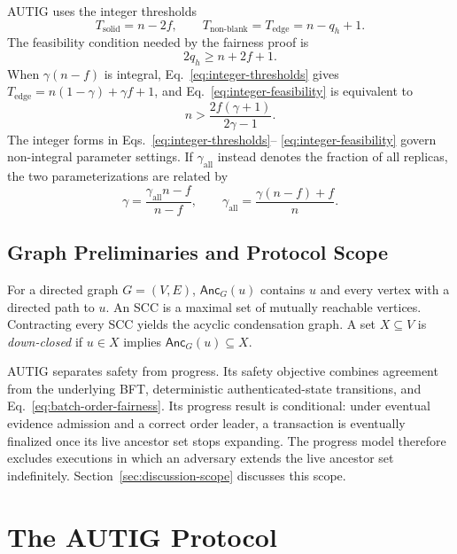 AUTIG uses the integer thresholds
\[
 T_{\mathrm{solid}}=n-2f,
 \qquad
 T_{\mathrm{non\mbox{-}blank}}=T_{\mathrm{edge}}
   =n-q_h+1.
 \tag{2}\label{eq:integer-thresholds}
\]
The feasibility condition needed by the fairness proof is
\[
 2q_h\ge n+2f+1.
 \tag{3}\label{eq:integer-feasibility}
\]
When $\gamma(n-f)$ is integral, Eq.~\eqref{eq:integer-thresholds}
gives $T_{\mathrm{edge}}=n(1-\gamma)+\gamma f+1$, and
Eq.~\eqref{eq:integer-feasibility} is equivalent to
\[
 n>\frac{2f(\gamma+1)}{2\gamma-1}.
\]
The integer forms in Eqs.~\eqref{eq:integer-thresholds}--
\eqref{eq:integer-feasibility} govern non-integral parameter settings.  If
$\gamma_{\mathrm{all}}$ instead denotes the fraction of all replicas, the two
parameterizations are related by
\[
 \gamma=\frac{\gamma_{\mathrm{all}}n-f}{n-f},
 \qquad
 \gamma_{\mathrm{all}}=\frac{\gamma(n-f)+f}{n}.
 \tag{4}\label{eq:gamma-reparameterization}
\]

\subsection{Graph Preliminaries and Protocol Scope}

For a directed graph $G=(V,E)$, $\mathsf{Anc}_G(u)$ contains $u$ and every
vertex with a directed path to $u$.  An SCC is a maximal set of mutually
reachable vertices.  Contracting every SCC yields the acyclic condensation
graph.  A set $X\subseteq V$ is \emph{down-closed} if
$u\in X$ implies $\mathsf{Anc}_G(u)\subseteq X$.

AUTIG separates safety from progress.  Its safety objective combines agreement
from the underlying BFT, deterministic authenticated-state transitions, and
Eq.~\eqref{eq:batch-order-fairness}.  Its progress result is conditional:
under eventual evidence admission and a correct order leader, a transaction is
eventually finalized once its live ancestor set stops expanding.  The progress
model therefore excludes executions in which an adversary extends the live
ancestor set indefinitely.  Section~\ref{sec:discussion-scope} discusses this
scope.

\section{The AUTIG Protocol}
\label{sec:protocol}

